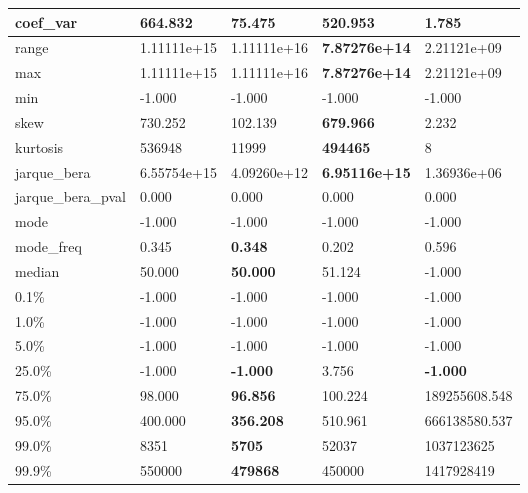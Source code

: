 \begin{table}[H]
\begin{tabular}{|l|m{10em}|m{10em}|m{10em}|m{10em}|}
\hline coef\_var & 664.832 & 75.475 & \bfseries 520.953 & \cellcolor[rgb]{0.9, 0.54, 0.52} 1.785 \\
\hline range & 1.11111e+15 & \cellcolor[rgb]{0.9, 0.54, 0.52} 1.11111e+16 & \bfseries 7.87276e+14 & 2.21121e+09 \\
\hline max & 1.11111e+15 & \cellcolor[rgb]{0.9, 0.54, 0.52} 1.11111e+16 & \bfseries 7.87276e+14 & 2.21121e+09 \\
\hline min & -1.000 & -1.000 & -1.000 & -1.000 \\
\hline skew & 730.252 & 102.139 & \bfseries 679.966 & \cellcolor[rgb]{0.9, 0.54, 0.52} 2.232 \\
\hline kurtosis & 536948 & 11999 & \bfseries 494465 & \cellcolor[rgb]{0.9, 0.54, 0.52} 8 \\
\hline jarque\_bera & 6.55754e+15 & 4.09260e+12 & \bfseries 6.95116e+15 & \cellcolor[rgb]{0.9, 0.54, 0.52} 1.36936e+06 \\
\hline jarque\_bera\_pval & 0.000 & 0.000 & 0.000 & 0.000 \\
\hline mode & -1.000 & -1.000 & -1.000 & -1.000 \\
\hline mode\_freq & 0.345 & \bfseries 0.348 & 0.202 & \cellcolor[rgb]{0.9, 0.54, 0.52} 0.596 \\
\hline median & 50.000 & \bfseries 50.000 & 51.124 & \cellcolor[rgb]{0.9, 0.54, 0.52} -1.000 \\
\hline 0.1\% & -1.000 & -1.000 & -1.000 & -1.000 \\
\hline 1.0\% & -1.000 & -1.000 & -1.000 & -1.000 \\
\hline 5.0\% & -1.000 & -1.000 & -1.000 & -1.000 \\
\hline 25.0\% & -1.000 & \bfseries -1.000 & \cellcolor[rgb]{0.9, 0.54, 0.52} 3.756 & \bfseries -1.000 \\
\hline 75.0\% & 98.000 & \bfseries 96.856 & 100.224 & \cellcolor[rgb]{0.9, 0.54, 0.52} 189255608.548 \\
\hline 95.0\% & 400.000 & \bfseries 356.208 & 510.961 & \cellcolor[rgb]{0.9, 0.54, 0.52} 666138580.537 \\
\hline 99.0\% & 8351 & \bfseries 5705 & 52037 & \cellcolor[rgb]{0.9, 0.54, 0.52} 1037123625 \\
\hline 99.9\% & 550000 & \bfseries 479868 & 450000 & \cellcolor[rgb]{0.9, 0.54, 0.52} 1417928419 \\
\hline
\end{tabular}
\end{table}
